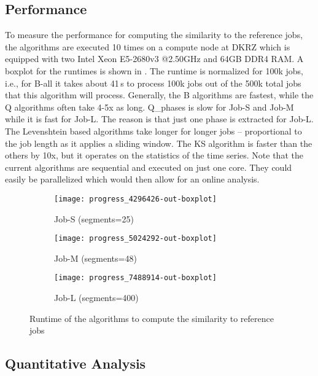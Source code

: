 \documentclass{jhps}
\begin{document}
\subsection{Performance}

To measure the performance for computing the similarity to the reference jobs, the algorithms are executed 10 times on a compute node at DKRZ which is equipped with two Intel Xeon E5-2680v3 @2.50GHz and 64GB DDR4 RAM.
A boxplot for the runtimes is shown in .
The runtime is normalized for 100k jobs, i.e., for B-all it takes about 41\,s to process 100k jobs out of the 500k total jobs that this algorithm will process.
Generally, the B algorithms are fastest, while the Q algorithms often take 4-5x as long.
Q\_phases is slow for Job-S and Job-M while it is fast for Job-L. 
The reason is that just one phase is extracted for Job-L.
The Levenshtein based algorithms take longer for longer jobs -- proportional to the job length as it applies a sliding window.
The KS algorithm is faster than the others by 10x, but it operates on the statistics of the time series.
Note that the current algorithms are sequential and executed on just one core.
They could easily be parallelized which would then allow for an online analysis.

\begin{figure}
\centering
  \begin{subfigure}{0.48\textwidth}
  \centering
  \texttt{[image: progress\_4296426-out-boxplot]}
  \caption{Job-S (segments=25)}\label{fig:perf-job-S}
  \end{subfigure}
  \begin{subfigure}{0.48\textwidth}
  \centering
  \texttt{[image: progress\_5024292-out-boxplot]}
  \caption{Job-M (segments=48)}\label{fig:perf-job-M}
  \end{subfigure}
  \begin{subfigure}{0.48\textwidth}
  \centering
  \texttt{[image: progress\_7488914-out-boxplot]}
  \caption{Job-L (segments=400)}\label{fig:perf-job-L}
  \end{subfigure}

  \caption{Runtime of the algorithms to compute the similarity to reference jobs}%
  \label{fig:performance}
\end{figure}


\subsection{Quantitative Analysis}
\end{document}
